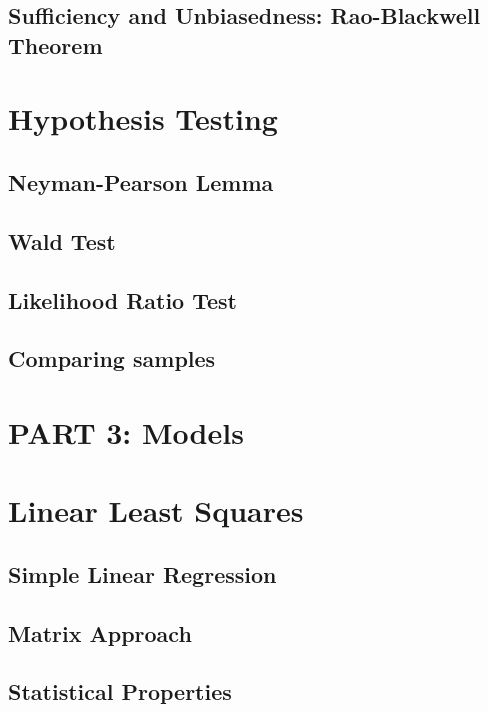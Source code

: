 \documentclass[
  openany]{book}
\theoremstyle{definition}
\theoremstyle{definition}
\theoremstyle{definition}
\theoremstyle{definition}
\theoremstyle{remark}
\begin{document}
\section{Sufficiency and Unbiasedness: Rao-Blackwell Theorem}\label{sufficiency-and-unbiasedness-rao-blackwell-theorem}

\chapter{Hypothesis Testing}\label{hypothesis-testing}

\section{Neyman-Pearson Lemma}\label{neyman-pearson-lemma}

\section{Wald Test}\label{wald-test}

\section{Likelihood Ratio Test}\label{likelihood-ratio-test}

\section{Comparing samples}\label{comparing-samples}

\chapter*{PART 3: Models}\label{part-3-models}


\chapter{Linear Least Squares}\label{linear-least-squares}

\section{Simple Linear Regression}\label{simple-linear-regression}

\section{Matrix Approach}\label{matrix-approach}

\section{Statistical Properties}\label{statistical-properties}
\end{document}
